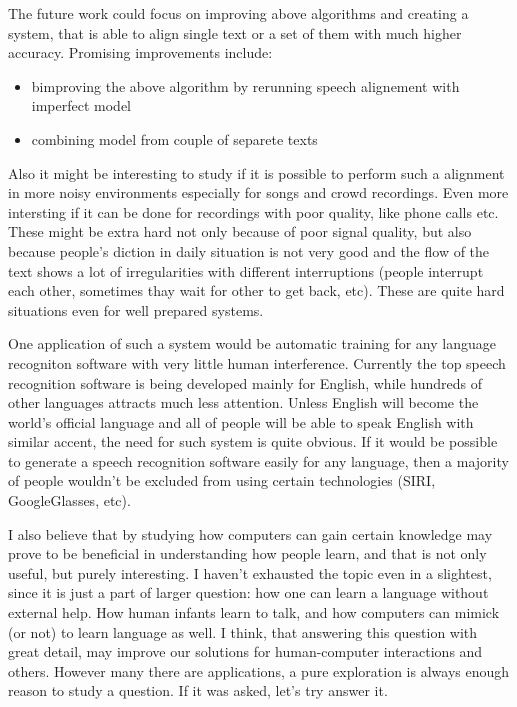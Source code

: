 \documentclass[12pt,a4paper,english]{article}
\begin{document}
The future work could focus on improving above algorithms and creating a system, that is able to align single text or a set of them with much higher accuracy.
Promising improvements include:
\begin{itemize}
    \item bimproving the above algorithm by rerunning speech alignement with imperfect model
    \item combining model from couple of separete texts
\end{itemize}
Also it might be interesting to study if it is possible to perform such a alignment in more noisy environments especially for songs and crowd recordings. \newline
Even more intersting if it can be done for recordings with poor quality, like phone calls etc. These might be extra hard not only because of poor signal quality, but also because people's diction in daily situation is not very good and the flow of the text shows a lot of irregularities with different interruptions (people interrupt each other, sometimes thay wait for other to get back, etc). \newline
These are quite hard situations even for well prepared systems. \newline

One application of such a system would be automatic training for any language recogniton software with very little human interference. Currently the top speech recognition software is being developed mainly for English, while hundreds of other languages attracts much less attention. Unless English will become the world's official language and all of people will be able to speak English with similar accent, the need for such system is quite obvious. \newline
If it would be possible to generate a speech recognition software easily for any language, then a majority of people wouldn't be excluded from using certain technologies (SIRI, GoogleGlasses, etc). \newline

I also believe that by studying how computers can gain certain knowledge may prove to be beneficial in understanding how people learn, and that is not only useful, but purely interesting. \newline
I haven't exhausted the topic even in a slightest, since it is just a part of larger question: how one can learn a language without external help. How human infants learn to talk, and how computers can mimick (or not) to learn language as well. \newline
I think, that answering this question with great detail, may improve our solutions for human-computer interactions and others. \newline
However many there are applications, a pure exploration is always enough reason to study a question. If it was asked, let's try answer it. \newline
\end{document}
